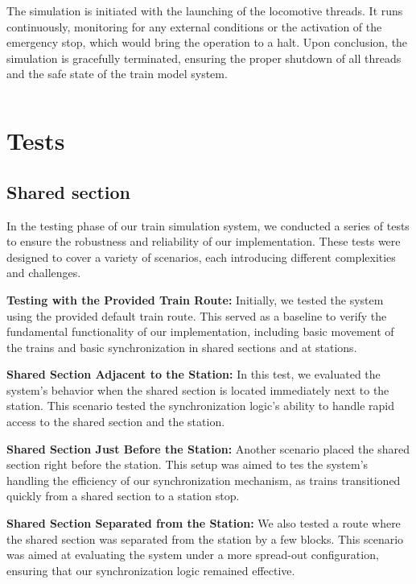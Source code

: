 \documentclass{article}
\begin{document}
    The simulation is initiated with the launching of the locomotive threads. It runs continuously, monitoring for any external conditions or the activation of the emergency stop, which would bring the operation to a halt. Upon conclusion, the simulation is gracefully terminated, ensuring the proper shutdown of all threads and the safe state of the train model system.

    \begin{lstlisting}
    \end{lstlisting}


    \section{Tests}

    \subsection*{Shared section}
    In the testing phase of our train simulation system, we conducted a series of tests to ensure the robustness and reliability of our implementation. These tests were designed to cover a variety of scenarios, each introducing different complexities and challenges.

    \textbf{Testing with the Provided Train Route:} Initially, we tested the system using the provided default train route. This served as a baseline to verify the fundamental functionality of our implementation, including basic movement of the trains and basic synchronization in shared sections and at stations.

    \textbf{Shared Section Adjacent to the Station:} In this test, we evaluated the system's behavior when the shared section is located immediately next to the station. This scenario tested the synchronization logic's ability to handle rapid access to the shared section and the station.

    \textbf{Shared Section Just Before the Station:} Another scenario placed the shared section right before the station. This setup was aimed to tes the system's handling the efficiency of our synchronization mechanism, as trains transitioned quickly from a shared section to a station stop.

    \textbf{Shared Section Separated from the Station:} We also tested a route where the shared section was separated from the station by a few blocks. This scenario was aimed at evaluating the system under a more spread-out configuration, ensuring that our synchronization logic remained effective.
\end{document}
